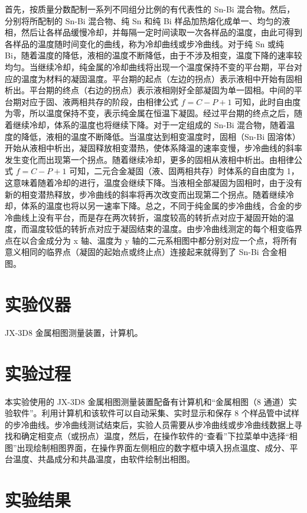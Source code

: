     首先，按质量分数配制一系列不同组分比例的有代表性的 Sn-Bi 混合物。然后，分别将所配制的 Sn-Bi 混合物、纯 Sn 和纯 Bi 样品加热熔化成单一、均匀的液相，然后让各样品缓慢冷却，并每隔一定时间读取一次各样品的温度，由此可得到各样品的温度随时间变化的曲线，称为冷却曲线或步冷曲线。对于纯 Sn 或纯 Bi，随着温度的降低，液相的温度不断降低，由于不涉及相变，温度下降的速率较均匀。当继续冷却，纯金属的冷却曲线将出现一个温度保持不变的平台期，平台对应的温度为材料的凝固温度。平台期的起点（左边的拐点）表示液相中开始有固相析出。平台期的终点（右边的拐点）表示液相刚好全部凝固为单一固相。中间的平台期对应于固、液两相共存的阶段，由相律公式 $f=C-P+1$ 可知，此时自由度为零，所以温度保持不变，表示纯金属在恒温下凝固。经过平台期的终点之后，随着继续冷却，体系的温度也将继续下降。对于一定组成的 Sn-Bi 混合物，随着温度的降低，液相的温度不断降低。当温度达到相变温度时，固相（Sn-Bi 固溶体）开始从液相中析出，凝固释放相变潜热，使体系降温的速率变慢，步冷曲线的斜率发生变化而出现第一个拐点。随着继续冷却，更多的固相从液相中析出。由相律公式 $f=C-P+1$ 可知，二元合金凝固（液、固两相共存）时体系的自由度为 1，这意味着随着冷却的进行，温度会继续下降。当液相全部凝固为固相时，由于没有新的相变潜热释放，步冷曲线的斜率将再次改变而出现第二个拐点。随着继续冷却，体系的温度也将以另一速率下降。总之，不同于纯金属的步冷曲线，合金的步冷曲线上没有平台，而是存在两次转折，温度较高的转折点对应于凝固开始的温度，而温度较低的转折点对应于凝固结束的温度。由步冷曲线测定的每个相变临界点在以合金成分为 x 轴、温度为 y 轴的二元系相图中都分别对应一个点，将所有意义相同的临界点（凝固的起始点或终止点）连接起来就得到了 Sn-Bi 合金相图。
    
\section{实验仪器}%
    JX-3D8 金属相图测量装置，计算机。
\section{实验过程}%
    本实验使用的 JX-3D8 金属相图测量装置配备有计算机和“金属相图（8 通道）实验软件”。利用计算机和该软件可以自动采集、实时显示和保存 8 个样品管中试样的步冷曲线。步冷曲线测试结束后，实验人员需要从步冷曲线或步冷曲线数据上寻找和确定相变点（或拐点）温度，然后，在操作软件的“查看”下拉菜单中选择“相图”出现绘制相图界面，在操作界面左侧相应的数字框中填入拐点温度、成分、平台温度、共晶成分和共晶温度，由软件绘制出相图。
\section{实验结果}
